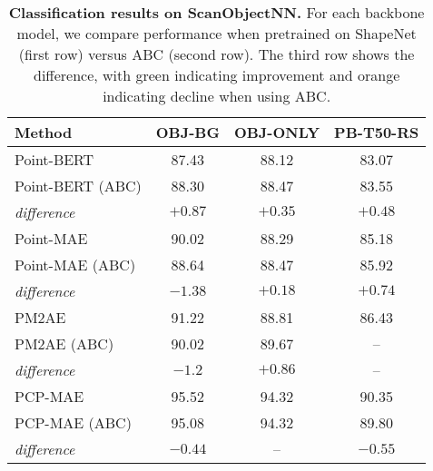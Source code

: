 \begin{table}
\begin{center}
\begin{tabular}{l|ccc}
    
\toprule
Method & OBJ-BG & OBJ-ONLY & PB-T50-RS \\
\midrule

Point-BERT~\cite{pbert} & 87.43 & 88.12 & 83.07\\
Point-BERT (ABC) & 88.30 & 88.47 & 83.55 \\
\textit{difference} & \cellcolor{green!25}$+0.87$ & \cellcolor{green!25}$+0.35$ & \cellcolor{green!25}$+0.48$ \\
\midrule
Point-MAE~\cite{pmae} & 90.02 & 88.29 & 85.18 \\
Point-MAE (ABC) & 88.64 & 88.47 & 85.92 \\
\textit{difference} & \cellcolor{orange!25}$-1.38$ & \cellcolor{green!25}$+0.18$ & \cellcolor{green!25}$+0.74$ \\
\midrule
PM2AE~\cite{pm2ae} & 91.22 & 88.81 & 86.43 \\
PM2AE (ABC) & 90.02 & 89.67 & -- \\
\textit{difference} & \cellcolor{orange!25}$-1.2$ & \cellcolor{green!25}$+0.86$ & -- \\
\midrule
PCP-MAE~\cite{pcpmae} & 95.52 & 94.32 & 90.35 \\
PCP-MAE (ABC) & 95.08 & 94.32 & 89.80 \\
\textit{difference} & \cellcolor{orange!25}$-0.44$ & \cellcolor{gray!25}-- & \cellcolor{orange!25}$-0.55$ \\

\bottomrule
\end{tabular}
\caption{{\bf Classification results on ScanObjectNN.} For each backbone model, we compare performance when pretrained on ShapeNet (first row) versus ABC (second row). The third row shows the difference, with green indicating improvement and orange indicating decline when using ABC.}
\setlength\tabcolsep{2pt}
\label{tb:scanobject}
\end{center}

\end{table}